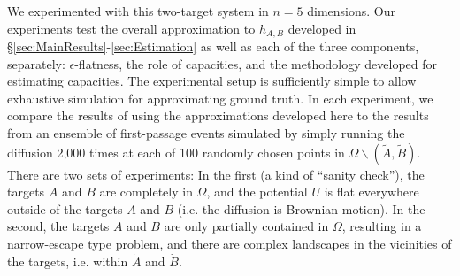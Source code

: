 \documentclass[12pt, nofootinbib,english, amsmath, amssymb, aps, priprint, graphicx,floatfix]{revtex4-1}
\theoremstyle{plain}
\theoremstyle{definition}
\theoremstyle{plain}
\newcommand{\dA}{{\dot A}}
\newcommand{\tA}{{\tilde A}}
\newcommand{\dB}{{\dot B}}
\newcommand{\tB}{{\tilde B}}
\begin{document}
We experimented with this two-target system in $n=5$ dimensions. Our experiments test the overall approximation to $h_{A,B}$ developed in \S\ref{sec:MainResults}-\ref{sec:Estimation} as well as each of the three components, separately: $\epsilon$-flatness, the role of capacities, and the methodology developed for estimating capacities.  The experimental setup is sufficiently simple to allow exhaustive simulation for approximating ground truth. In each experiment, we compare the results of using the approximations developed here to the results from an ensemble of first-passage events simulated by simply running the diffusion 2,000 times at each of 100 randomly chosen points in $\Omega\backslash (\tA,\tB)$. There are two sets of experiments: In the first (a kind of ``sanity check''), the targets $A$ and $B$ are completely in $\Omega$, and the potential $U$ is flat everywhere outside of the targets $A$ and $B$ (i.e. the diffusion is Brownian motion). In the second, the targets $A$ and $B$ are only partially contained in $\Omega$, resulting in a narrow-escape type problem, and there are complex landscapes in the vicinities of the targets, i.e. within $\dA$ and $\dB$.
\end{document}
